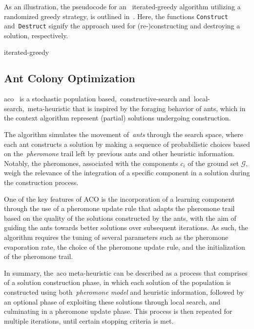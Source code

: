 As an illustration, the pseudocode for an ~\acrshort{iterated-greedy} algorithm
utilizing a randomized greedy strategy, is outlined
in~. Here, the functions \texttt{Construct}
and~\texttt{Destruct} signify the approach used for (re-)constructing and
destroying a solution, respectively.

\begin{algorithm}
  
  \caption{\acrlong{iterated-greedy}}
  \label{algorithm:iterated-greedy}
\end{algorithm}

\subsection{Ant Colony Optimization}
\label{subsec:aco}
\acrfull{aco}~\cite{dorigo2010anta,outeiro2021application,luke2013essentialsa,blum2003metaheuristics}
is a stochastic population based,~\acrshort{constructive-search}
and~\acrshort{local-search},~\acrshort{meta-heuristic} that is inspired by the
foraging behavior of ants, which in the context algorithm represent (partial)
solutions undergoing construction.

The algorithm simulates the movement of~\textit{ants} through the search space,
where each ant constructs a solution by making a sequence of probabilistic
choices based on the~\textit{pheromone} trail left by previous ants and other
heuristic information. Notably, the pheromones, associated with the components
$c_{i}$ of the ground set $\mathcal{G}$, weigh the relevance of the integration
of a specific component in a solution during the construction process.

One of the key features of ACO is the incorporation of a learning component
through the use of a pheromone update rule that adapts the pheromone trail based
on the quality of the solutions constructed by the ants, with the aim of guiding
the ants towards better solutions over subsequent iterations. As such, the
algorithm requires the tuning of several parameters such as the pheromone
evaporation rate, the choice of the pheromone update rule, and the
initialization of the pheromone trail.

In summary, the~\acrshort{aco} meta-heuristic can be described as a process that
comprises of a solution construction phase, in which each solution of the
population is constructed using both~\textit{pheromone model} and heuristic
information, followed by an optional phase of exploiting these solutions through
local search, and culminating in a pheromone update phase. This process is then
repeated for multiple iterations, until certain stopping criteria is met.

